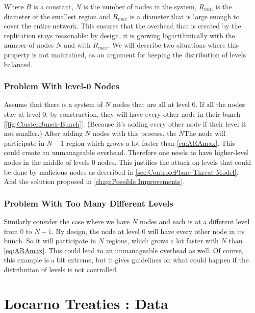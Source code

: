 \documentclass[a4paper,11pt,oneside]{report}
\begin{document}
Where $B$ is a constant, $N$ is the number of nodes in the system, $R_{min}$ is
the diameter of the smallest region and $R_{max}$ is a diameter that is large
enough to cover the entire network. This ensures that the overhead that is
created by the replication stays reasonable: by design, it is growing
logarithmically with the number of nodes $N$ and with $R_{max}$. We will
describe two situations where this property is not maintained, as an argument
for keeping the distribution of levels balanced.

\subsection{Problem With level-0 Nodes} \label{app:levels-zero}
Assume that there is a system of $N$ nodes that are all at level 0. If all
the nodes stay at level 0, by construction, they will have every other node in
their bunch [\autoref{fig:ClusterBunch-Bunch}]. (Because it’s adding every
other node if their level it not smaller.) After adding $N$ nodes with this
process, the $N$The node will participate in $N-1$ region which grows a lot
faster than \autoref{eq:ARAmax}. This could create an unmanageable overhead.
Therefore one needs to have higher-level nodes in the middle of levels 0 nodes.
This justifies the attack on levels that could be done by malicious nodes as
described in \autoref{sec:ControlePlane-Threat-Model}. And the solution
proposed in \autoref{chap:Possible Improvements}.

\subsection{Problem With Too Many Different Levels} Similarly consider the case
where we have $N$ nodes and each is at a different level from $0$ to $N-1$. By
design, the node at level $0$ will have every other node in its bunch. So it
will participate in $N$ regions, which grows a lot faster with $N$ than
\autoref{eq:ARAmax}. This could lead to an unmanageable overhead as well. Of
course, this example is a bit extreme, but it gives guidelines on what could
happen if the distribution of levels is not controlled.

\chapter{Locarno Treaties : Data} \label{app:LocarnoTreaties-data}
\end{document}
